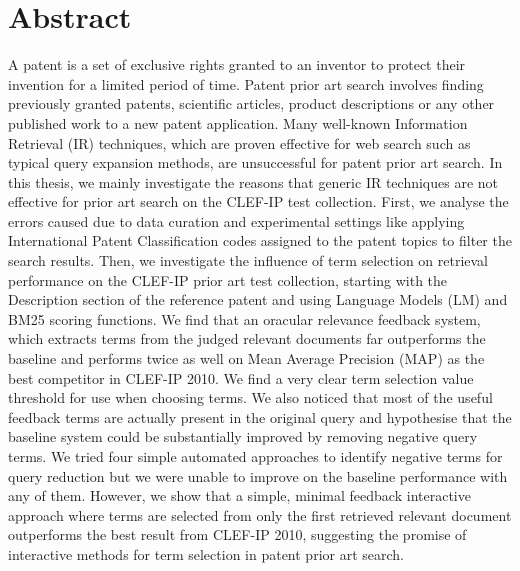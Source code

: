 \chapter*{Abstract}
\vspace{-1em}
A patent is a set of exclusive rights granted to an inventor to protect 
their invention for a limited period of time. Patent prior art search involves 
finding previously granted patents, 
scientific articles, product descriptions or any other published work 
to a new patent application.
Many well-known Information Retrieval (IR) techniques, which are proven effective 
for web search such as typical query expansion methods, are unsuccessful for patent 
prior art search.
In this thesis, we mainly investigate the reasons that generic IR techniques are not 
effective for prior art search on the CLEF-IP test collection.   
First, we analyse the errors caused due to data curation and experimental settings 
like applying International Patent Classification codes assigned to the patent topics 
to filter the search results.  
Then, we investigate the influence of term selection on retrieval
performance on the CLEF-IP prior art test collection, starting with
the Description section of the reference patent and using Language Models (LM) and BM25
scoring functions. We find that an oracular relevance feedback system,
which extracts terms from the judged relevant documents far
outperforms the baseline and performs twice as well on Mean Average Precision (MAP) as the best
competitor in CLEF-IP 2010. We find a very clear term selection value
threshold for use when choosing terms.  We also noticed that most of
the useful feedback terms are actually present in the original query
and hypothesise that the baseline system could be substantially
improved by removing negative query terms.
We tried four simple automated approaches to identify negative terms
for query reduction but we were unable to improve on the baseline
performance with any of them. However, we show that a
simple, minimal feedback interactive approach where terms are selected
from only the first retrieved relevant document outperforms the best
result from CLEF-IP 2010, suggesting the promise of interactive methods
for term selection in patent prior art search.

